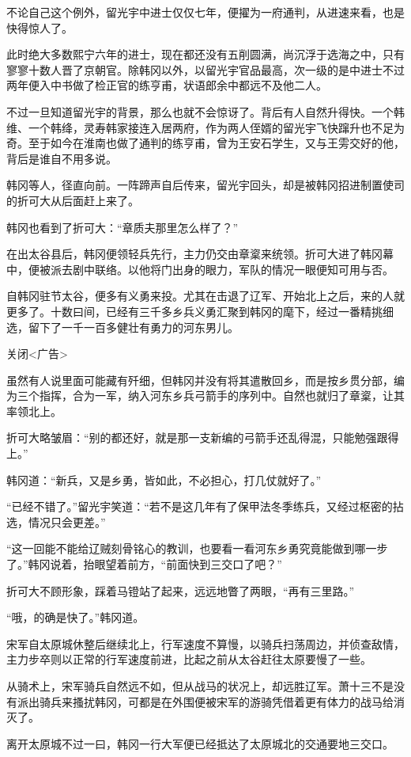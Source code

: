 不论自己这个例外，留光宇中进士仅仅七年，便擢为一府通判，从进速来看，也是快得惊人了。

此时绝大多数熙宁六年的进士，现在都还没有五削圆满，尚沉浮于选海之中，只有寥寥十数人晋了京朝官。除韩冈以外，以留光宇官品最高，次一级的是中进士不过两年便入中书做了检正官的练亨甫，状语郎余中都远不及他二人。

不过一旦知道留光宇的背景，那么也就不会惊讶了。背后有人自然升得快。一个韩维、一个韩绛，灵寿韩家接连入居两府，作为两人侄婿的留光宇飞快蹿升也不足为奇。至于如今在淮南也做了通判的练亨甫，曾为王安石学生，又与王雱交好的他，背后是谁自不用多说。

韩冈等人，径直向前。一阵蹄声自后传来，留光宇回头，却是被韩冈招进制置使司的折可大从后面赶上来了。

韩冈也看到了折可大：“章质夫那里怎么样了？”

在出太谷县后，韩冈便领轻兵先行，主力仍交由章楶来统领。折可大进了韩冈幕中，便被派去剧中联络。以他将门出身的眼力，军队的情况一眼便知可用与否。

自韩冈驻节太谷，便多有义勇来投。尤其在击退了辽军、开始北上之后，来的人就更多了。十数曰间，已经有三千多乡兵义勇汇聚到韩冈的麾下，经过一番精挑细选，留下了一千一百多健壮有勇力的河东男儿。

关闭<广告>

虽然有人说里面可能藏有歼细，但韩冈并没有将其遣散回乡，而是按乡贯分部，编为三个指挥，合为一军，纳入河东乡兵弓箭手的序列中。自然也就归了章楶，让其率领北上。

折可大略皱眉：“别的都还好，就是那一支新编的弓箭手还乱得混，只能勉强跟得上。”

韩冈道：“新兵，又是乡勇，皆如此，不必担心，打几仗就好了。”

“已经不错了。”留光宇笑道：“若不是这几年有了保甲法冬季练兵，又经过枢密的拈选，情况只会更差。”

“这一回能不能给辽贼刻骨铭心的教训，也要看一看河东乡勇究竟能做到哪一步了。”韩冈说着，抬眼望着前方，“前面快到三交口了吧？”

折可大不顾形象，踩着马镫站了起来，远远地瞥了两眼，“再有三里路。”

“哦，的确是快了。”韩冈道。

宋军自太原城休整后继续北上，行军速度不算慢，以骑兵扫荡周边，并侦查敌情，主力步卒则以正常的行军速度前进，比起之前从太谷赶往太原要慢了一些。

从骑术上，宋军骑兵自然远不如，但从战马的状况上，却远胜辽军。萧十三不是没有派出骑兵来搔扰韩冈，可都是在外围便被宋军的游骑凭借着更有体力的战马给消灭了。

离开太原城不过一曰，韩冈一行大军便已经抵达了太原城北的交通要地三交口。

